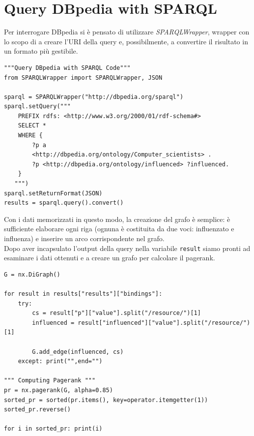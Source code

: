 \documentclass[12pt, twoside]{article}
\begin{document}
\section{Query DBpedia with SPARQL}
Per interrogare DBpedia si è pensato di utilizzare \textit{SPARQLWrapper}, wrapper con lo scopo di a creare l'URI della query e, possibilmente, a convertire il risultato in un formato più gestibile.
\vspace{6pt}
\begin{lstlisting}[caption={Query DBpedia},captionpos=b,language=iPython]
"""Query DBpedia with SPARQL Code"""
from SPARQLWrapper import SPARQLWrapper, JSON

sparql = SPARQLWrapper("http://dbpedia.org/sparql")
sparql.setQuery("""
	PREFIX rdfs: <http://www.w3.org/2000/01/rdf-schema#>
	SELECT *
	WHERE {
		?p a
		<http://dbpedia.org/ontology/Computer_scientists> .
		?p <http://dbpedia.org/ontology/influenced> ?influenced.
	}
   """)
sparql.setReturnFormat(JSON)
results = sparql.query().convert()
\end{lstlisting}
Con i dati memorizzati in questo modo, la creazione del grafo è semplice: è sufficiente elaborare ogni riga (ognuna è costituita da due voci: influenzato e influenza) e inserire un arco corrispondente nel grafo.\\
Dopo aver incapsulato l'output della query nella variabile \lstinline[language = iPython]{result} siamo pronti ad esaminare i dati ottenuti e a creare un grafo per calcolare il pagerank.

\vspace{6pt}

\begin{lstlisting}[caption={Computing Pagerank},captionpos=b,firstnumber=35,language=iPython]
G = nx.DiGraph()

for result in results["results"]["bindings"]:
	try:
		cs = result["p"]["value"].split("/resource/")[1]
		influenced = result["influenced"]["value"].split("/resource/")[1]
		
		G.add_edge(influenced, cs)
	except:	print("",end="")

""" Computing Pagerank """
pr = nx.pagerank(G, alpha=0.85)
sorted_pr = sorted(pr.items(), key=operator.itemgetter(1))
sorted_pr.reverse()

for i in sorted_pr:	print(i)
\end{lstlisting}



\newpage
\end{document}
